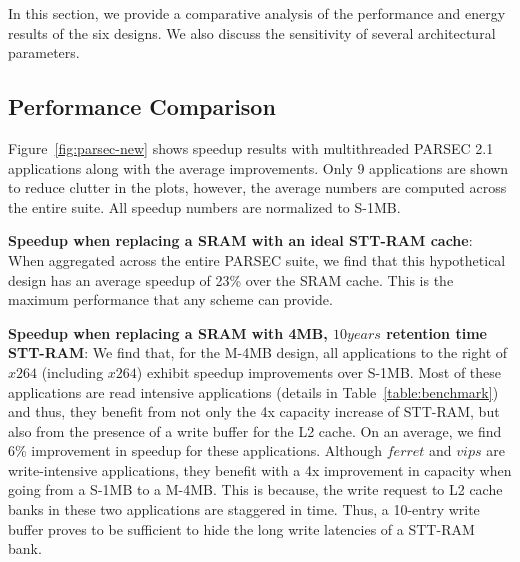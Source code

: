 In this section, we provide a comparative analysis of the performance and energy results of the six designs.
We also discuss the sensitivity of several architectural parameters.




%


\subsection {Performance Comparison}


Figure~\ref{fig:parsec-new} shows speedup results with multithreaded PARSEC 2.1
applications along with the average improvements. Only 9 applications are shown to reduce clutter in the plots, however,
the average numbers are computed across the entire suite. All speedup numbers are normalized to S-1MB.

{\bf Speedup when replacing a SRAM with an ideal STT-RAM cache}: When aggregated across the entire PARSEC suite, we find that this hypothetical design has an average speedup of 23\% over the SRAM cache. This is the maximum performance that any scheme can provide.

{\bf Speedup when replacing a SRAM with 4MB, $10years$ retention time STT-RAM}: We find that, for the M-4MB design, all applications to the right of $x264$ (including $x264$) exhibit speedup improvements over S-1MB. Most of these applications are read intensive applications (details in Table~\ref{table:benchmark}) and thus, they benefit from not only the 4x capacity increase of STT-RAM, but also from the presence of a write buffer for the L2 cache. On an average, we find 6\% improvement in speedup for these applications. Although $ferret$ and $vips$ are write-intensive applications, they benefit with a 4x improvement in capacity when going from a S-1MB to a M-4MB. This is because, the write request to L2 cache banks in these two applications are staggered in time. Thus, a 10-entry write buffer proves to be sufficient to hide the long write latencies of a STT-RAM bank.

